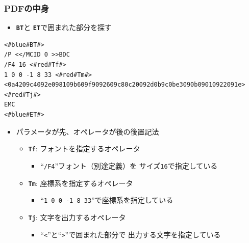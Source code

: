 \begin{frame}[fragile]\frametitle{PDFの中身}
  \begin{itemize}
  \item \footnotesize \texttt{\color{blue}\bfseries BT}と
    \texttt{\color{blue}\bfseries ET}で囲まれた部分を探す
  \end{itemize}

  \centering
  \begin{tcolorbox}
    [width=\linewidth,left=0mm,right=0mm,top=0mm,bottom=0mm,%
      colframe=structure.fg,colbacktitle=structure.fg,colback=structure.bg,%
      title={\tiny foobar.html.qdf抜粋（BTとETで囲まれた部分）}]
    \begin{lstlisting}
<#blue#BT#>
/P <</MCID 0 >>BDC
/F4 16 <#red#Tf#>
1 0 0 -1 8 33 <#red#Tm#>
<0a4209c4092e098109b609f9092609c80c20092d0b9c0be3090b09010922091e> <#red#Tj#>
EMC
<#blue#ET#>
    \end{lstlisting}
  \end{tcolorbox}

  \begin{itemize}
  \item \footnotesize パラメータが先、オペレータが後の後置記法
    \begin{itemize}
    \item \scriptsize\texttt{\color{red}\bfseries Tf}:
      フォントを指定するオペレータ
      \begin{itemize}
      \item \tiny ``\texttt{/F4}''フォント（別途定義）を
        サイズ\texttt{16}で指定している
      \end{itemize}
    \item \scriptsize\texttt{\color{red}\bfseries Tm}:
      座標系を指定するオペレータ
      \begin{itemize}
      \item \tiny ``\texttt{1 0 0 -1 8 33}''で座標系を指定している
      \end{itemize}
    \item \scriptsize\texttt{\color{red}\bfseries Tj}:
      文字を出力するオペレータ
      \begin{itemize}
      \item \tiny ``\texttt{<}''と``\texttt{>}''で囲まれた部分で
        出力する文字を指定している
      \end{itemize}
    \end{itemize}
  \end{itemize}
\end{frame}


